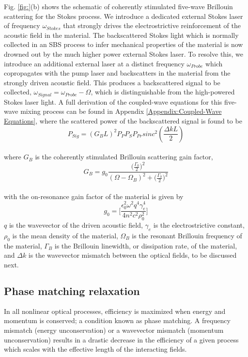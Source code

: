 \documentclass[%
  reprint,
  superscriptaddress,
  amsmath,amssymb,
  aps,
  prapplied,
]{revtex4-2}
\begin{document}
Fig. \ref{fig:}(b) shows the schematic of coherently stimulated five-wave Brillouin scattering for the Stokes process. We introduce a dedicated external Stokes laser of frequency $\omega_{Stokes}$ that strongly drives the electrostrictive reinforcement of the acoustic field in the material. The backscattered Stokes light which is normally collected in an SBS process to infer mechanical properties of the material is now drowned out by the much higher power external Stokes laser. To resolve this, we introduce an additional external laser at a distinct frequency $\omega_{Probe}$ which copropagates with the pump laser and backscatters in the material from the strongly driven acoustic field. This produces a backscattered signal to be collected, $\omega_{Signal} = \omega_{Probe} - \Omega$, which is distinguishable from the high-powered Stokes laser light. A full derivation of the coupled-wave equations for this five-wave mixing process can be found in Appendix \ref{Appendix:Coupled-Wave Equations}, where the scattered power of the backscattered signal is found to be
\\
\begin{equation}
  P_{Sig} = (G_{B}L)^{2}P_{P}P_{S}P_{Pr}sinc^{2}\left(\frac{\Delta kL}{2}\right)
\end{equation}
\\
where $G_{B}$ is the coherently stimulated Brillouin scattering gain factor,
\\
\begin{equation}
  G_{B} = g_{0}\frac{\big(\frac{\Gamma_{0}}{2}\big)^{2}}{(\Omega - \Omega_{B})^{2} + \big(\frac{\Gamma_{0}}{2}\big)^{2}}
\end{equation}
\\
with the on-resonance gain factor of the material is given by
\\
\begin{equation}
  g_{0} = \Bigg[\frac{\epsilon_{0}^{2}\omega^{2}q^{4}\gamma_{e}^{4}}{4n^{2}c^{2}\rho_{0}^{2}}\Bigg]
\end{equation}
$q$ is the wavevector of the driven acoustic field, $\gamma_{e}$ is the electrostrictive constant, $\rho_{0}$ is the mean density of the material, $\Omega_{B}$ is the resonant Brillouin frequency of the material, $\Gamma_{B}$ is the Brillouin linewidth, or dissipation rate, of the material, and $\Delta k$ is the wavevector mismatch between the optical fields, to be discussed next.


\subsection*{Phase matching relaxation}\label{Theoretical Framework: Phase matching relaxation}
In all nonlinear optical processes, efficiency is maximized when energy and momentum is conserved; a condition known as phase matching. A frequency mismatch (energy unconservation) or a wavevector mismatch (momentum unconservation) results in a drastic decrease in the efficiency of a given process which scales with the effective length of the interacting fields.\cite{boyd2020nonlinear, maker1962effects}
\end{document}
